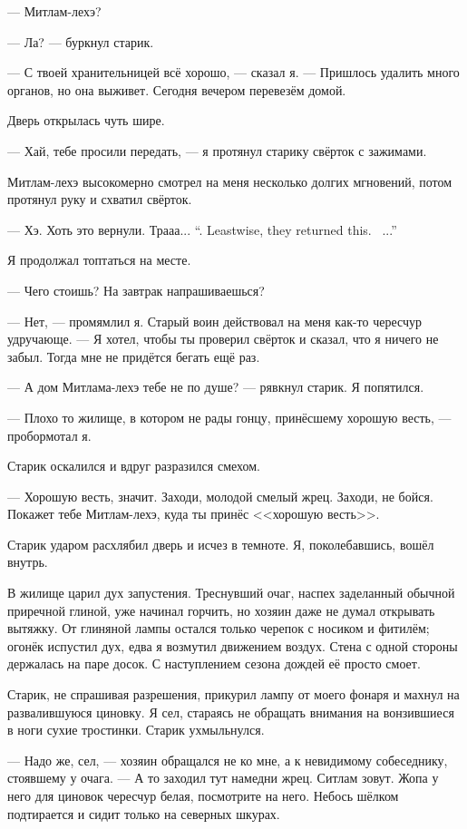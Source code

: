 --- Митлам-лехэ?

--- Ла? --- буркнул старик.

--- С твоей хранительницей всё хорошо, --- сказал я.
--- Пришлось удалить много органов, но она выживет.
Сегодня вечером перевезём домой.

Дверь открылась чуть шире.

--- Хай, тебе просили передать, --- я протянул старику свёрток с зажимами.

Митлам-лехэ высокомерно смотрел на меня несколько долгих мгновений, потом протянул руку и схватил свёрток.

{--- Хэ. Хоть это вернули. Трааа...}
{``\Choe. Leastwise, they returned this. \Traa\ ...''}

Я продолжал топтаться на месте.

--- Чего стоишь?
На завтрак напрашиваешься?

--- Нет, --- промямлил я.
Старый воин действовал на меня как-то чересчур удручающе.
--- Я хотел, чтобы ты проверил свёрток и сказал, что я ничего не забыл.
Тогда мне не придётся бегать ещё раз.

--- А дом Митлама-лехэ тебе не по душе? --- рявкнул старик.
Я попятился.

--- Плохо то жилище, в котором не рады гонцу, принёсшему хорошую весть, --- пробормотал я.

Старик оскалился и вдруг разразился смехом.

--- Хорошую весть, значит.
Заходи, молодой смелый жрец.
Заходи, не бойся.
Покажет тебе Митлам-лехэ, куда ты принёс <<хорошую весть>>.

Старик ударом расхлябил дверь и исчез в темноте.
Я, поколебавшись, вошёл внутрь.

В жилище царил дух запустения.
Треснувший очаг, наспех заделанный обычной приречной глиной, уже начинал горчить\FM, но хозяин даже не думал открывать вытяжку.
От глиняной лампы остался только черепок с носиком и фитилём;
огонёк испустил дух, едва я возмутил движением воздух.
Стена с одной стороны держалась на паре досок.
С наступлением сезона дождей её просто смоет.

Старик, не спрашивая разрешения, прикурил лампу от моего фонаря и махнул на развалившуюся циновку.
Я сел, стараясь не обращать внимания на вонзившиеся в ноги сухие тростинки.
Старик ухмыльнулся.

--- Надо же, сел, --- хозяин обращался не ко мне, а к невидимому собеседнику, стоявшему у очага.
--- А то заходил тут намедни жрец.
Ситлам зовут.
Жопа у него для циновок чересчур белая, посмотрите на него.
Небось шёлком подтирается и сидит только на северных шкурах.

